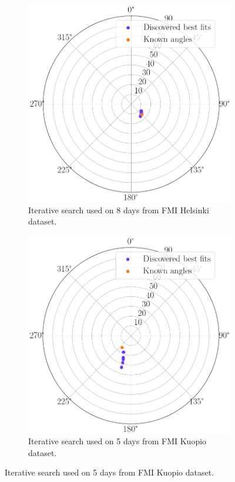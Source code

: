 \begin{figure}[H]
     \centering
     \begin{subfigure}[b]{0.45\textwidth}
         \centering
         \includegraphics[width=\textwidth]{pics/iterative_multiday_helsinki}
         \caption{Iterative search used on 8 days from FMI Helsinki dataset.}
         \label{iterative_multiday_helsinki2019}
     \end{subfigure}
     \hfill
     \begin{subfigure}[b]{0.45\textwidth}
         \centering
         \includegraphics[width=\textwidth]{pics/iterative_multiday_kuopio}
         \caption{Iterative search used on 5 days from FMI Kuopio dataset.}
         \label{iterative_multiday_kuopio2019}
     \end{subfigure}
     \hfill
     

\end{figure}
